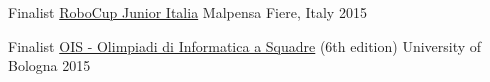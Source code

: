 
\begin{cvhonors}

  \cvhonor
    {Finalist}
    {\href{http://www.robocupjunior.it/}{RoboCup Junior Italia}}
    {Malpensa Fiere, Italy}
    {2015}

  \cvhonor
    {Finalist}
    {\href{https://www.olimpiadi-informatica.it/}{OIS - Olimpiadi di Informatica a Squadre} (6th edition)}
    {University of Bologna}
    {2015}

\end{cvhonors}
